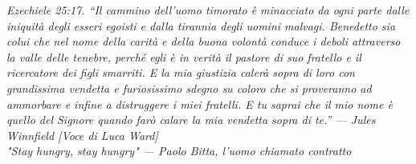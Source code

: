 \documentclass[twoside,openright,titlepage,fleqn,
headinclude,12pt,a4paper,BCOR5mm,footinclude]{scrbook}
\begin{document}
\frenchspacing
\raggedbottom
{}
\pagestyle{plain}

\pagestyle{scrheadings}
\tableofcontents
\listoffigures
\lstlistoflistings	
\cleardoublepage
\thispagestyle{empty}
\begin{flushright}
\null{}
\emph{Ezechiele 25:17. “Il cammino dell'uomo timorato è minacciato da ogni parte dalle iniquità degli esseri egoisti e dalla tirannia degli uomini malvagi. Benedetto sia colui che nel nome della carità e della buona volontà conduce i deboli attraverso la valle delle tenebre, perché egli è in verità il pastore di suo fratello e il ricercatore dei figli smarriti. E la mia giustizia calerà sopra di loro con grandissima vendetta e furiosissimo sdegno su coloro che si proveranno ad ammorbare e infine a distruggere i miei fratelli. E tu saprai che il mio nome è quello del Signore quando farò calare la mia vendetta sopra di te.” \break --- Jules Winnfield [Voce di Luca Ward]} \null \\
\emph{"Stay hungry, stay hungry" \break --- Paolo Bitta, l'uomo chiamato contratto} \null
\end{flushright}
\cleardoublepage
\nocite{*}











\newpage
\end{document}

